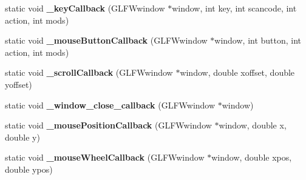 \begin{DoxyCompactItemize}
\item 
\hypertarget{classs9_1_1gl_1_1GLFWApp_ab1a639c24d823ce4b429081cd8735acd}{static void {\bfseries \-\_\-key\-Callback} (\-G\-L\-F\-Wwindow $\ast$window, int key, int scancode, int action, int mods)}\label{classs9_1_1gl_1_1GLFWApp_ab1a639c24d823ce4b429081cd8735acd}

\item 
\hypertarget{classs9_1_1gl_1_1GLFWApp_a81f28369aa7f3eb53d4c457e507cadb9}{static void {\bfseries \-\_\-mouse\-Button\-Callback} (\-G\-L\-F\-Wwindow $\ast$window, int button, int action, int mods)}\label{classs9_1_1gl_1_1GLFWApp_a81f28369aa7f3eb53d4c457e507cadb9}

\item 
\hypertarget{classs9_1_1gl_1_1GLFWApp_acd21fd6f732e56001c1a8a8241f0efdf}{static void {\bfseries \-\_\-scroll\-Callback} (\-G\-L\-F\-Wwindow $\ast$window, double xoffset, double yoffset)}\label{classs9_1_1gl_1_1GLFWApp_acd21fd6f732e56001c1a8a8241f0efdf}

\item 
\hypertarget{classs9_1_1gl_1_1GLFWApp_a88be880204b5ac067636e99e9a928cf8}{static void {\bfseries \-\_\-window\-\_\-close\-\_\-callback} (\-G\-L\-F\-Wwindow $\ast$window)}\label{classs9_1_1gl_1_1GLFWApp_a88be880204b5ac067636e99e9a928cf8}

\item 
\hypertarget{classs9_1_1gl_1_1GLFWApp_a82338f06db610bfee909c1b5709c1f73}{static void {\bfseries \-\_\-mouse\-Position\-Callback} (\-G\-L\-F\-Wwindow $\ast$window, double x, double y)}\label{classs9_1_1gl_1_1GLFWApp_a82338f06db610bfee909c1b5709c1f73}

\item 
\hypertarget{classs9_1_1gl_1_1GLFWApp_a4b62f8fb529ab17da6fd549e18e7113c}{static void {\bfseries \-\_\-mouse\-Wheel\-Callback} (\-G\-L\-F\-Wwindow $\ast$window, double xpos, double ypos)}\label{classs9_1_1gl_1_1GLFWApp_a4b62f8fb529ab17da6fd549e18e7113c}

\end{DoxyCompactItemize}
